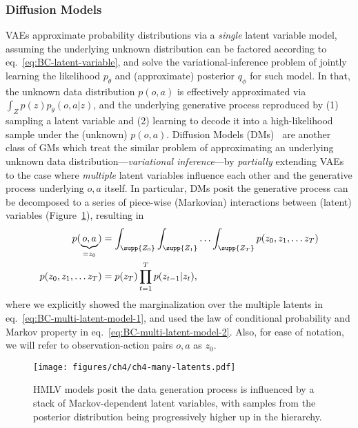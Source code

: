 \subsubsection{Diffusion Models}
VAEs approximate probability distributions via a \emph{single} latent variable model, assuming the underlying unknown distribution can be factored according to eq.~\ref{eq:BC-latent-variable}, and solve the variational-inference problem of jointly learning the likelihood \( p_\theta \) and (approximate) posterior \( q_\phi \) for such model.
In that, the unknown data distribution \( p(o,a) \) is effectively approximated via \( \int_Z p(z) p_\theta(o,a \vert z) \), and the underlying generative process reproduced by (1) sampling a latent variable and (2) learning to decode it into a high-likelihood sample under the (unknown) \( p(o,a) \).
Diffusion Models (DMs)~\citep{hoDenoisingDiffusionProbabilistic2020} are another class of GMs which treat the similar problem of approximating an underlying unknown data distribution---\emph{variational inference}---by \emph{partially} extending VAEs to the case where \emph{multiple} latent variables influence each other and the generative process underlying \(o,a\) itself.
In particular, DMs posit the generative process can be decomposed to a series of piece-wise (Markovian) interactions between (latent) variables (Figure~\ref{fig:ch4-many-latents}), resulting in
\begin{align}
    p(\underbrace{o,a}_{= z_0}) &= \int_{\supp{Z_0}} \int_{\supp{Z_1}} \hdots \int_{\supp{Z_T}} p(z_0, z_1, \dots z_T) \label{eq:BC-multi-latent-model-1} \\ 
    p(z_0, z_1, \dots z_T) &= p(z_T) \prod_{t=1}^{T} p(z_{t-1} \vert z_t), \label{eq:BC-multi-latent-model-2}
\end{align}
where we explicitly showed the marginalization over the multiple latents in eq.~\ref{eq:BC-multi-latent-model-1}, and used the law of conditional probability and Markov property in eq.~\ref{eq:BC-multi-latent-model-2}.
Also, for ease of notation, we will refer to observation-action pairs \( o,a \) as \( z_0 \).

\begin{figure}
    \centering
    \texttt{[image: figures/ch4/ch4-many-latents.pdf]}
    \caption{HMLV models posit the data generation process is influenced by a stack of Markov-dependent latent variables, with samples from the posterior distribution being progressively higher up in the hierarchy.}
    \label{fig:ch4-many-latents}
\end{figure}

